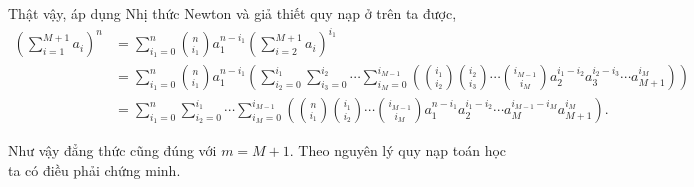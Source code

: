 \begin{enumerate}
{    Thật vậy, áp dụng Nhị thức Newton và giả thiết quy nạp ở trên ta được, 
    \begin{align*}
        \displaystyle\left(\sum\limits_{i=1}^{M+1} a_i\right)^n 
        &= \sum\limits_{i_1 = 0}^n {n \choose i_1}a_1^{n-i_1}\left(\sum\limits_{i=2}^{M+1}a_i\right)^{i_1} \\
        &= \sum\limits_{i_1 = 0}^n {n \choose i_1}a_1^{n-i_1} \left(\sum\limits_{i_2 = 0}^{i_1} \sum\limits_{i_3 = 0}^{i_2} \cdots \sum\limits_{i_{M} = 0}^{i_{M-1}} \left({i_1 \choose i_2} {i_2 \choose i_3} \cdots {i_{M-1} \choose i_{M}} a_2^{i_1-i_2} a_3^{i_2-i_3} \cdots a_{M+1}^{i_{M}}\right)\right) \\
        &= \sum\limits_{i_1 = 0}^n \sum\limits_{i_2 = 0}^{i_1} \cdots \sum\limits_{i_{M} = 0}^{i_{M-1}} \left({n \choose i_1} {i_1 \choose i_2} \cdots {i_{M-1} \choose i_{M}} a_1^{n-i_1} a_2^{i_1-i_2} \cdots a_{M}^{i_{M-1}-i_{M}}a_{M+1}^{i_{M}}\right).
    \end{align*}

    Như vậy đẳng thức cũng đúng với $m = M+1$. Theo nguyên lý quy nạp toán học ta có điều phải chứng minh. 
    } 
\end{enumerate}